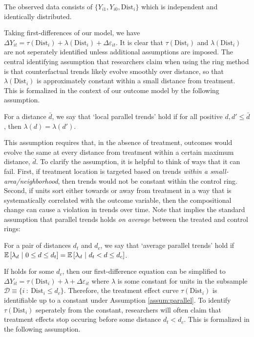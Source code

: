 \documentclass[10pt]{article}
\newcommand{\dist}{\text{Dist}}
\begin{document}
\begin{assumption}
    The observed data consists of $\{ Y_{i1}, Y_{i0}, \dist_{i}\}$ which is independent and identically distributed.
\end{assumption}

Taking first-differences of our model, we have $\Delta Y_{it} = \tau(\dist_i) + \lambda(\dist_i) + \Delta \varepsilon_{it}$. It is clear that $\tau(\dist_i)$ and $\lambda(\dist_i)$ are not seperately identified unless additional assumptions are imposed. The central identifying assumption that researchers claim when using the ring method is that counterfactual trends likely evolve smoothly over distance, so that $\lambda(\dist_i)$ is approximately constant within a small distance from treatment. This is formalized in the context of our outcome model by the following assumption. 

\begin{assumption}\label{assum:parallel}
    For a distance $\bar{d}$, we say that `local parallel trends' hold if for all positive $d, d' \leq \bar{d}$, then $\lambda(d) = \lambda(d')$.
\end{assumption}

This assumption requires that, in the absence of treatment, outcomes would evolve the same at every distance from treatment within a certain maximum distance, $\bar{d}$. To clarify the assumption, it is helpful to think of ways that it can fail. First, if treatment location is targeted based on trends \emph{within a small-area/neighborhood}, then trends would not be constant within the control ring. Second, if units sort either towards or away from treatment in a way that is systematically correlated with the outcome variable, then the compositional change can cause a violation in trends over time. Note that  implies the standard assumption that parallel trends holds \emph{on average} between the treated and control rings:

\begin{assumption}\label{assum:parallel_weak}
    For a pair of distances $d_t$ and $d_c$, we say that `average parallel trends' hold if $\mathbb{E}\left[\lambda_d \ \vert \ 0 \leq d \leq d_t\right] = \mathbb{E}\left[\lambda_d \ \vert \ d_t < d \leq d_c\right]$.
\end{assumption}

If  holds for some $d_c$, then our first-difference equation can be simplified to $\Delta Y_{it} = \tau(\dist_i) + \lambda + \Delta \varepsilon_{it}$ where $\lambda$ is some constant for units in the subsample $\mathcal{D} \equiv \{i \ : \ \dist_i \leq d_c \} $. Therefore, the treatment effect curve $\tau(\dist_i)$ is identifiable up to a constant under Assumption \ref{assum:parallel}. To identify $\tau(\dist_i)$ seperately from the constant, researchers will often claim that treatment effects stop occuring before some distance $d_t < d_c$. This is formalized in  the following assumption. 
\end{document}
